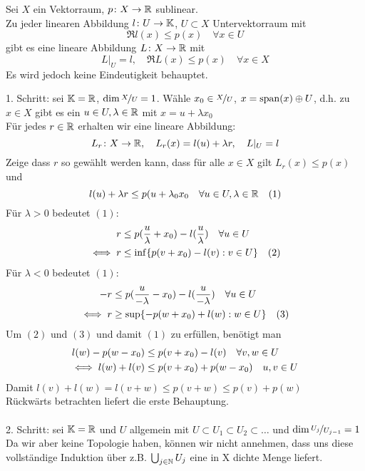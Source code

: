 \begin{satz}  \label{satz:20.2-HahnBanach}
		Sei $X$ ein Vektorraum, $p \colon X \rightarrow \mathbb{R}$ sublinear. \\
		Zu jeder linearen Abbildung $l \colon U \rightarrow \mathbb{K}$, $U \subset X$ Untervektorraum mit
			\[ \Re l(x) \leq p(x) \quad \forall x \in U \]
		gibt es eine lineare Abbildung $L \colon X \rightarrow \mathbb{R}$ mit 
			\[ L|_{U} = l, \quad \Re  L(x) \leq p(x) \quad \forall x \in X \]
		Es wird jedoch keine Eindeutigkeit behauptet.
\end{satz}

\begin{beweis}
	1. Schritt: sei $\mathbb{K} = \mathbb{R}$, $\dim \nicefrac{X}{U} = 1$. Wähle $x_{0} \in \nicefrac{X}{U}$, $x = \operatorname{span}(x) \oplus U$, d.h. zu $x \in X$ gibt es ein $u \in U, \lambda \in \mathbb{R}$ mit $x = u + \lambda x_{0}$ \\
	Für jedes $r \in \mathbb{R}$ erhalten wir eine lineare Abbildung:
	\[ L_{r} \colon X \rightarrow \mathbb{R}, \quad L_{r} (x) = l(u) + \lambda r, \quad L|_{U} = l \]
	Zeige dass $r$ so gewählt werden kann, dass für alle $x \in X$ gilt $L_{r}(x) \leq p(x)$ und 
	\[ l(u) + \lambda r \leq p(u + \lambda_{0} x_{0} \quad \forall u \in U, \lambda \in \mathbb{R} \quad (1) \label{eq:20.2.5-1} \]
	Für $\lambda > 0$ bedeutet \hyperref[eq:20.2.5-1]{$(1)$}:
	\begin{align*}
		r & \leq p(\frac{u}{\lambda} + x_{0}) - l(\frac{u}{\lambda}) \quad \forall u \in U \\
		\iff r & \leq \inf \{ p( v + x_{0}) - l(v) : v \in U \} \quad (2) \label{eq:20.2.5-2}
	\end{align*}
	Für $\lambda < 0$ bedeutet \hyperref[eq:20.2.5-1]{$(1)$}:
	\begin{align*}
		- r & \leq p(\frac{u}{- \lambda} - x_{0}) - l(\frac{u}{- \lambda}) \quad \forall u \in U \\
		\iff r & \geq \sup \{ - p( w + x_{0}) + l(w) : w \in U \} \quad (3) \label{eq:20.2.5-3}
	\end{align*}
	Um \hyperref[eq:20.2.5-2]{$(2)$} und \hyperref[eq:20.2.5-3]{$(3)$} und damit \hyperref[eq:20.2.5-1]{$(1)$} zu erfüllen, benötigt man
	\begin{align*}
		l(w) - p(w - x_{0}) & \leq p(v + x_{0}) - l(v) \quad \forall v, w \in U \\
		\iff l(w) + l(v) & \leq p(v + x_{0}) + p(w - x_{0}) \quad u, v \in U
	\end{align*}
	Damit $l(v) + l(w) = l(v + w) \leq p(v + w) \leq p(v) + p(w)$ \\
	Rückwärts betrachten liefert die erste Behauptung. \\ \\
	2. Schritt: sei $\mathbb{K} = \mathbb{R}$ und $U$ allgemein mit $U \subset U_{1} \subset U_{2} \subset \dotsc$ und $\dim \nicefrac{U_{j}}{U_{j - 1}} = 1$ \\
	Da wir aber keine Topologie haben, können wir nicht annehmen, dass uns diese vollständige Induktion über z.B. $\bigcup_{j \in \mathbb{N}} U_{j}$ eine in X dichte Menge liefert.
\end{beweis}



\newpage